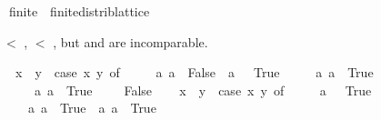 \begin{isabellebody}
{\isafoldproof}%
%
\isadelimproof
%
\endisadelimproof
\isanewline
\isanewline
{}\isamarkupfalse%
\isanewline
\isanewline
{}\isamarkupfalse%
\ finite{\isacharunderscore}{\kern0pt}{}\ {\isacharcolon}{\kern0pt}{\isacharcolon}{\kern0pt}\ finite{\isacharunderscore}{\kern0pt}distrib{\isacharunderscore}{\kern0pt}lattice\ %
\begin{isamarkuptext}%
 $<$ , $<$ ,
  but  and  are incomparable.%
\end{isamarkuptext}\isamarkuptrue%
\isamarkupfalse%
\isanewline
\ \ {\isachardoublequoteopen}x\ {\isacharless}{\kern0pt}\ y\ {\isasymlongleftrightarrow}\ {\isacharparenleft}{\kern0pt}case\ {\isacharparenleft}{\kern0pt}x{\isacharcomma}{\kern0pt}\ y{\isacharparenright}{\kern0pt}\ of\isanewline
\ \ \ \ \ {\isacharparenleft}{\kern0pt}a\ a\ {\isasymRightarrow}\ False\ {\isacharbar}{\kern0pt}\ {\isacharparenleft}{\kern0pt}a\ {\isacharunderscore}{\kern0pt}{\isacharparenright}{\kern0pt}\ {\isasymRightarrow}\ True\isanewline
\ \ \ {\isacharbar}{\kern0pt}\ \ {\isacharparenleft}{\kern0pt}a\ a\ {\isasymRightarrow}\ True\isanewline
\ \ \ {\isacharbar}{\kern0pt}\ \ {\isacharparenleft}{\kern0pt}a\ a\ {\isasymRightarrow}\ True\ \ {\isacharbar}{\kern0pt}\ {\isacharunderscore}{\kern0pt}\ {\isasymRightarrow}\ False{\isacharparenright}{\kern0pt}{\isachardoublequoteclose}\isanewline
\isanewline
{}\isamarkupfalse%
\ \isanewline
\ \ {\isachardoublequoteopen}x\ {\isasymle}\ y\ {\isasymlongleftrightarrow}\ {\isacharparenleft}{\kern0pt}case\ {\isacharparenleft}{\kern0pt}x{\isacharcomma}{\kern0pt}\ y{\isacharparenright}{\kern0pt}\ of\isanewline
\ \ \ \ \ {\isacharparenleft}{\kern0pt}a\ {\isacharunderscore}{\kern0pt}{\isacharparenright}{\kern0pt}\ {\isasymRightarrow}\ True\isanewline
\ \ \ {\isacharbar}{\kern0pt}\ {\isacharparenleft}{\kern0pt}a\ a\ {\isasymRightarrow}\ True\ {\isacharbar}{\kern0pt}\ {\isacharparenleft}{\kern0pt}a\ a\ {\isasymRightarrow}\ True\isanewline

\end{isabellebody}
